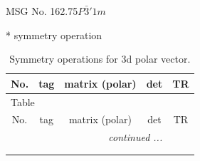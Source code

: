 \documentclass[fleqn,8pt]{jsarticle}
\begin{document}
\setcounter{MaxMatrixCols}{32}

\renewcommand{\tablename}{Table~}
\renewcommand{\figurename}{Figure~}
\begin{center}
\LARGE
MSG No. 162.75\quad$P\bar{3}'1m$
\end{center}
* symmetry operation
\renewcommand{\arraystretch}{1.3}
\begin{longtable}{ccccc}
\caption{Symmetry operations for 3d polar vector.}
 \\
 \hline \hline
No. & tag & matrix (polar) & det & TR \\ \hline \endfirsthead

\multicolumn{4}{l}{\tablename\ \thetable{}} \\
 \hline \hline
No. & tag & matrix (polar) & det & TR \\ \hline \endhead

 \hline \hline
\multicolumn{4}{r}{\footnotesize\it continued ...} \\ \endfoot

 \hline \hline
\multicolumn{4}{r}{} \\ \endlastfoot


\end{longtable}
\end{document}
